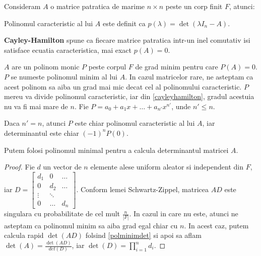 Consideram $A$ o matrice patratica de marime $n \times n$ peste un corp finit $F$, atunci:

\begin{defn}
  Polinomul caracteristic al lui $A$ este definit ca
  $p(\lambda) = \det(\lambda I_{n} - A)$.
\end{defn}

\begin{thm}
  \label{cayleyhamilton}
  \textbf{Cayley-Hamilton} spune ca fiecare matrice patratica intr-un inel
  comutativ isi satisface ecuatia caracteristica, mai exact $p(A) = 0$.
\end{thm}

$A$ are un polinom monic $P$ peste corpul $F$ de grad minim pentru care
$P(A) = 0$. $P$ se numeste polinomul minim al lui $A$. In
cazul matricelor rare, ne asteptam ca acest polinom sa aiba un grad mai mic
decat cel al polinomului caracteristic. $P$ mereu va divide polinomul
caracteristic, iar din \ref{cayleyhamilton}, gradul acestuia nu va fi mai mare
de $n$. Fie $P = a_{0} + a_{1}x + \ldots + a_{n'}x^{n'}$, unde $n' \leq n$.

\begin{lem}
  \label{polminimdet}
  Daca $n' = n$, atunci $P$ este chiar polinomul caracteristic al lui $A$, iar
  determinantul este chiar $(-1)^{n}P(0)$.
\end{lem}

\begin{lem}
  Putem folosi polinomul minimal pentru a calcula determinantul matricei $A$.
\end{lem}

\begin{proof}
  Fie $d$ un vector de $n$ elemente
  alese uniform aleator si independent din $F$, iar
  $D =
  \begin{bmatrix}
    d_{1} & 0 & \dots \\
    0 & d_{2} & \dots \\
    \vdots & \ddots & \\
    0 & \dots & d_{n}
  \end{bmatrix}$. Conform lemei Schwartz-Zippel, matricea $AD$ este singulara cu
  probabilitate de cel mult $\frac{n}{|F|}$. In cazul in care nu este, atunci ne
  asteptam ca polinomul minim sa aiba grad egal chiar cu $n$. In acest caz,
  putem calcula rapid $\det(AD)$ folsind \ref{polminimdet} si apoi sa aflam
  $\det(A) = \frac{\det(AD)}{det(D)}$, iar $\det(D) = \prod_{i=1}^{n} d_{i}$.
\end{proof}

